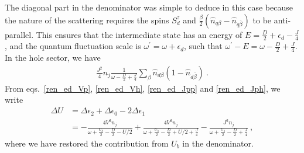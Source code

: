 The diagonal part in the denominator was simple to deduce in this case because the nature of the scattering requires the spins \(S_d^z\) and \(\frac{\beta}{2}\left(\hat n_{q\beta} - \hat n_{q \overline\beta}\right)\) to be anti-parallel. This ensures that the intermediate state has an energy of \(E = \frac{D}{2} + \epsilon_d - \frac{J}{4}\), and the quantum fluctuation scale is \(\omega^\prime = \omega + \epsilon_d\), such that \(\omega^\prime - E = \omega - \frac{D}{2} + \frac{J}{4}\). In the hole sector, we have
\begin{eqnarray}
	\label{ren_ed_Jph}
	\frac{J^2}{4} n_j\frac{1}{\omega - \frac{D}{2} + \frac{J}{4}} \sum_{\beta}\hat n_{d\beta}\left( 1 - \hat n_{d\overline\beta} \right)~.
\end{eqnarray}
From eqs.~\eqref{ren_ed_Vp}, \eqref{ren_ed_Vh}, \eqref{ren_ed_Jpp} and \eqref{ren_ed_Jph}, we write
\begin{eqnarray}
	\Delta U &= \Delta \epsilon_2 + \Delta \epsilon_0 - 2\Delta \epsilon_1 \nonumber\\
		 &= -\frac{4V^2 n_j}{\omega + \frac{U_b}{2} - \frac{D}{2} - U/2} + \frac{4V^2 n_j}{\omega + \frac{U_b}{2} - \frac{D}{2} + U/2 + \frac{J}{4}} - \frac{J^2n_j}{\omega + \frac{U_b}{2} - \frac{D}{2} + \frac{J}{4}}~,
\end{eqnarray}
where we have restored the contribution from \(U_b\) in the denominator.

